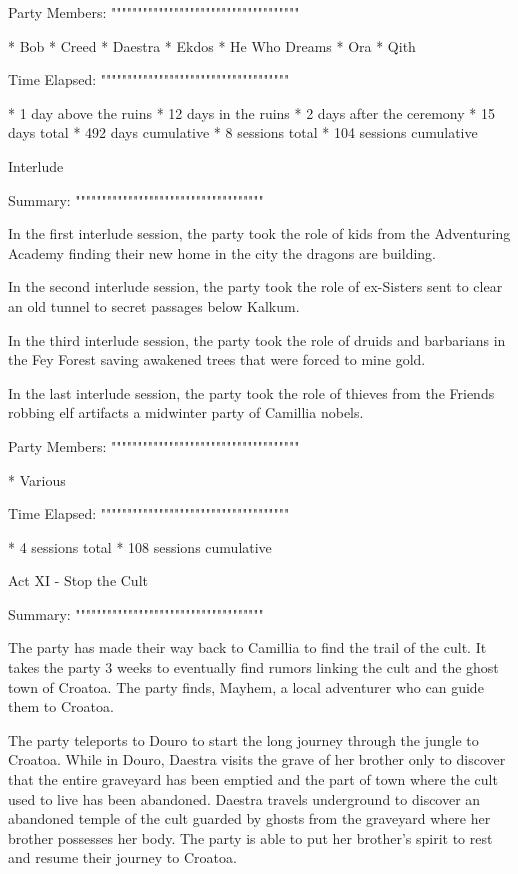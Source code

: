 Party Members:
""""""""""""""""""""""""""""""""""""

  * Bob
  * Creed
  * Daestra
  * Ekdos
  * He Who Dreams
  * Ora
  * Qith

Time Elapsed:
""""""""""""""""""""""""""""""""""""

  * 1 day above the ruins
  * 12 days in the ruins
  * 2 days after the ceremony
  * 15 days total
  * 492 days cumulative
  * 8 sessions total
  * 104 sessions cumulative

Interlude
^^^^^^^^^^^^^^^^^^^^^^^^^^^^^^^^^^^^

Summary:
""""""""""""""""""""""""""""""""""""

In the first interlude session, the party took the role of kids from the Adventuring Academy finding their new home in the city the dragons are building.

In the second interlude session, the party took the role of ex-Sisters sent to clear an old tunnel to secret passages below Kalkum.

In the third interlude session, the party took the role of druids and barbarians in the Fey Forest saving awakened trees that were forced to mine gold.

In the last interlude session, the party took the role of thieves from the Friends robbing elf artifacts a midwinter party of Camillia nobels.

Party Members:
""""""""""""""""""""""""""""""""""""

  * Various

Time Elapsed:
""""""""""""""""""""""""""""""""""""

  * 4 sessions total
  * 108 sessions cumulative

Act XI - Stop the Cult
^^^^^^^^^^^^^^^^^^^^^^^^^^^^^^^^^^^^

Summary:
""""""""""""""""""""""""""""""""""""

The party has made their way back to Camillia to find the trail of the cult.
It takes the party 3 weeks to eventually find rumors linking the cult and the ghost town of Croatoa.
The party finds, Mayhem, a local adventurer who can guide them to Croatoa.

The party teleports to Douro to start the long journey through the jungle to Croatoa.
While in Douro, Daestra visits the grave of her brother only to discover that the entire graveyard has been emptied and the part of town where the cult used to live has been abandoned.
Daestra travels underground to discover an abandoned temple of the cult guarded by ghosts from the graveyard where her brother possesses her body.
The party is able to put her brother's spirit to rest and resume their journey to Croatoa.


